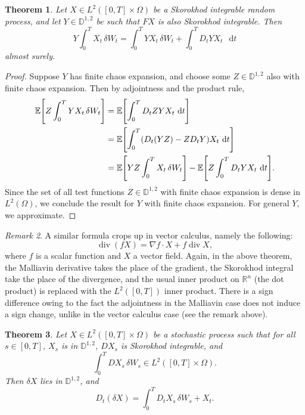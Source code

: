 \documentclass[11pt, a4paper, twoside]{book}
\theoremstyle{plain}
\newtheorem{theorem}{Theorem}
\theoremstyle{definition}
\theoremstyle{remark}
\newtheorem{remark}[theorem]{Remark}
\renewcommand{\d}{\mathop{}\!\mathrm{d}}
\newcommand{\bbD}{\mathbb{D}}
\newcommand{\bbE}{\mathbb{E}}
\newcommand{\bbR}{\mathbb{R}}
\DeclarePairedDelimiter{\brackets}{\lbrack}{\rbrack}
\DeclareMathOperator\diverg{div}
\begin{document}
\begin{theorem}
	Let $X \in L^2([0,T]\times\Omega)$ be a Skorokhod integrable random
	process, and let $Y \in \bbD^{1, 2}$ be such that $FX$ is also Skorokhod
	integrable. Then
	\[
		Y \int_0^T X_t \, \delta{W}_t
		= \int_0^T Y X_t \, \delta{W}_t + \int_0^T D_t Y X_t \, \d{t}
	\]
	almost surely.
\end{theorem}
\begin{proof}
	Suppose $Y$ has finite chaos expansion, and choose some $Z \in \bbD^{1, 2}$
	also with finite chaos expansion. Then by adjointness and the product rule,
	\begin{align*}
		\bbE\brackets*{
			Z \int_0^T Y X_t \, \delta{W}_t
		}
		 & = \bbE\brackets*{
		\int_0^T D_t{Z} Y X_t \, \d{t}
		}                    \\
		 & = \bbE\brackets*{
		\int_0^T (D_t(YZ) - Z D_t{Y}) X_t \, \d{t}
		}                    \\
		 & = \bbE\brackets*{
			YZ \int_0^T X_t \, \delta{W}_t
		} - \bbE\brackets*{
		Z \int_0^T D_t{Y} X_t \, \d{t}
		}.
	\end{align*}
	Since the set of all test functions $Z \in \bbD^{1, 2}$ with finite chaos
	expansion is dense in $L^2(\Omega)$, we conclude the result for $Y$ with
	finite chaos expansion. For general $Y$, we approximate.
\end{proof}

\begin{remark}
	A similar formula crops up in vector calculus, namely the following:
	\[
		\diverg(fX) = \nabla{f} \cdot X + f \diverg{X},
	\]
	where $f$ is a scalar function and $X$ a vector field. Again, in the above
	theorem, the Malliavin derivative takes the place of the gradient, the
	Skorokhod integral take the place of the divergence, and the usual inner
	product on $\bbR^n$ (the dot product) is replaced with the $L^2([0, T])$
	inner product. There is a sign difference owing to the fact the adjointness
	in the Malliavin case does not induce a sign change, unlike in the vector
	calculus case (see the remark above).
\end{remark}

\begin{theorem}
	Let $X \in L^2([0,T]\times\Omega)$ be a stochastic process such that
	for all $s \in [0, T]$, $X_s$ is in $\bbD^{1, 2}$, $D{X_s}$ is
	Skorokhod integrable, and
	\[
		\int_0^T DX_s \, \delta{W}_s \in L^2([0,T]\times\Omega).
	\]
	Then $\delta{X}$ lies in $\bbD^{1, 2}$, and
	\[
		D_t(\delta{X}) = \int_0^T D_t{X_s} \, \delta{W}_s + X_t.
	\]
\end{theorem}
\end{document}
